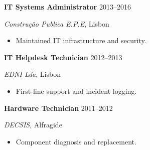 \documentclass[a4paper,10pt]{article}
\begin{document}
\begin{minipage}[t]{0.62\textwidth}
    \textbf{IT Systems Administrator} \hfill \color{accent}2013--2016\par
    \textit{\color{accent}Construção Publica E.P.E}, Lisbon\par
    \begin{itemize}[leftmargin=*, label=\color{accent}•, itemsep=2pt, topsep=4pt]
        \item \small\color{mainlight}Maintained IT infrastructure and security.
    \end{itemize}
    \vspace{6pt}

    \textbf{IT Helpdesk Technician} \hfill \color{accent}2012--2013\par
    \textit{\color{accent}EDNI Lda}, Lisbon\par
    \begin{itemize}[leftmargin=*, label=\color{accent}•, itemsep=2pt, topsep=4pt]
        \item \small\color{mainlight}First-line support and incident logging.
    \end{itemize}
    \vspace{6pt}

    \textbf{Hardware Technician} \hfill \color{accent}2011--2012\par
    \textit{\color{accent}DECSIS}, Alfragide\par
    \begin{itemize}[leftmargin=*, label=\color{accent}•, itemsep=2pt, topsep=4pt]
        \item \small\color{mainlight}Component diagnosis and replacement.
    \end{itemize}
\end{minipage}
\end{document}
